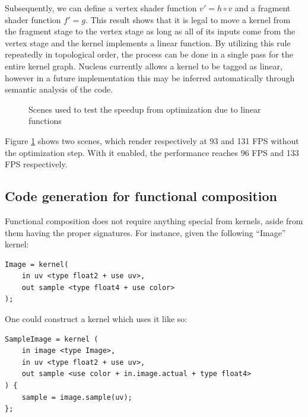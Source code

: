 Subsequently, we can define a vertex shader function $v\prime = h \circ v$ and a fragment shader function $f\prime = g$. This result shows that it is legal to move a kernel from the fragment stage to the vertex stage as long as all of its inputs come from the vertex stage and the kernel implements a linear function. By utilizing this rule repeatedly in topological order, the process can be done in a single pass for the entire kernel graph. Nucleus currently allows a kernel to be tagged as linear, however in a future implementation this may be inferred automatically through semantic analysis of the code.

\begin{figure}[h!]
  \centering
  \caption{Scenes used to test the speedup from optimization due to linear functions}
  \label{fig:linFuncOpt}
\end{figure}

Figure \ref{fig:linFuncOpt} shows two scenes, which render respectively at 93 and 131 FPS without the optimization step. With it enabled, the performance reaches 96 FPS and 133 FPS respectively.

\subsection{Code generation for functional composition}

Functional composition does not require anything special from kernels, aside from them having the proper signatures. For instance, given the following ``Image'' kernel:
\begin{lstlisting}[frame=single]
Image = kernel(
    in uv <type float2 + use uv>,
    out sample <type float4 + use color>
);
\end{lstlisting}
One could construct a kernel which uses it like so:
\begin{lstlisting}[frame=single]
SampleImage = kernel (
	in image <type Image>,
	in uv <type float2 + use uv>,
	out sample <use color + in.image.actual + type float4>
) {
	sample = image.sample(uv);
};
\end{lstlisting}

